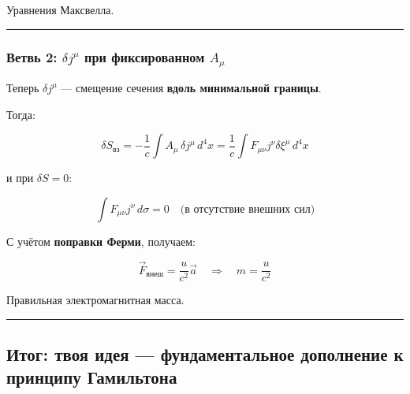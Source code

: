 \documentclass[11pt]{article}
\begin{document}
Уравнения Максвелла.

\begin{center}\rule{0.5\linewidth}{\linethickness}\end{center}

\subsubsection{\texorpdfstring{Ветвь 2: \(\delta j^\mu\) при
фиксированном
\(A_\mu\)}{Ветвь 2: \textbackslash{}delta j\^{}\textbackslash{}mu при фиксированном A\_\textbackslash{}mu}}


Теперь \(\delta j^\mu\) --- смещение сечения \textbf{вдоль минимальной
границы}.

Тогда:

\[
\delta S_{\text{вз}} = - \frac{1}{c} \int A_\mu \, \delta j^\mu \, d^4x = \frac{1}{c} \int F_{\mu\nu} j^\nu \delta \xi^\mu \, d^4x
\]

и при \(\delta S = 0\):

\[
\int F_{\mu\nu} j^\nu \, d\sigma = 0
\quad \text{(в отсутствие внешних сил)}
\]

С учётом \textbf{поправки Ферми}, получаем:

\[
\vec{F}_{\text{внеш}} = \frac{u}{c^2} \vec{a}
\quad \Rightarrow \quad
m = \frac{u}{c^2}
\]

Правильная электромагнитная масса.

\begin{center}\rule{0.5\linewidth}{\linethickness}\end{center}

\subsection{ Итог: твоя идея --- фундаментальное дополнение к принципу
Гамильтона}
\end{document}

